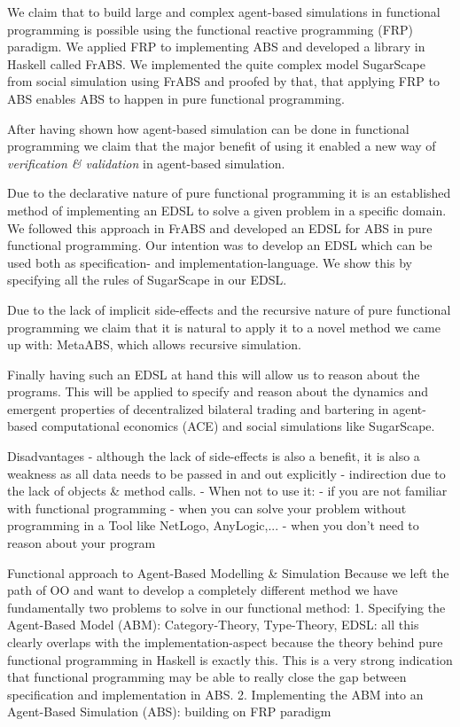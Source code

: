 We claim that to build large and complex agent-based simulations in functional programming is possible using the functional reactive programming (FRP) paradigm. We applied FRP to implementing ABS and developed a library in Haskell called FrABS. We implemented the quite complex model SugarScape from social simulation using FrABS and proofed by that, that applying FRP to ABS enables ABS to happen in pure functional programming.

After having shown how agent-based simulation can be done in functional programming we claim that the major benefit of using it enabled a new way of \textit{verification \& validation} in agent-based simulation. 

Due to the declarative nature of pure functional programming it is an established method of implementing an EDSL to solve a given problem in a specific domain. We followed this approach in FrABS and developed an EDSL for ABS in pure functional programming. Our intention was to develop an EDSL which can be used both as specification- and implementation-language. We show this by specifying all the rules of SugarScape in our EDSL.

Due to the lack of implicit side-effects and the recursive nature of pure functional programming we claim that it is natural to apply it to a novel method we came up with: MetaABS, which allows recursive simulation.

Finally having such an EDSL at hand this will allow us to reason about the programs. This will be applied to specify and reason about the dynamics and emergent properties of decentralized bilateral trading and bartering in agent-based computational economics (ACE) and social simulations like SugarScape.

Disadvantages
- although the lack of side-effects is also a benefit, it is also a weakness as all data needs to be passed in and out explicitly 
- indirection due to the lack of objects \& method calls.
- When not to use it: 
	- if you are not familiar with functional programming
	- when you can solve your problem without programming in a Tool like NetLogo, AnyLogic,...
	- when you don't need to reason about your program
	
Functional approach to Agent-Based Modelling \& Simulation
Because we left the path of OO and want to develop a completely different method we have fundamentally two problems to solve in our functional method:
1. Specifying the Agent-Based Model (ABM): Category-Theory, Type-Theory, EDSL: all this clearly overlaps with the  implementation-aspect because the theory behind pure functional programming in Haskell is exactly this. This is a very strong indication that functional programming may be able to really close the gap between specification and implementation in ABS.
2. Implementing the ABM into an Agent-Based Simulation (ABS): building on FRP paradigm

